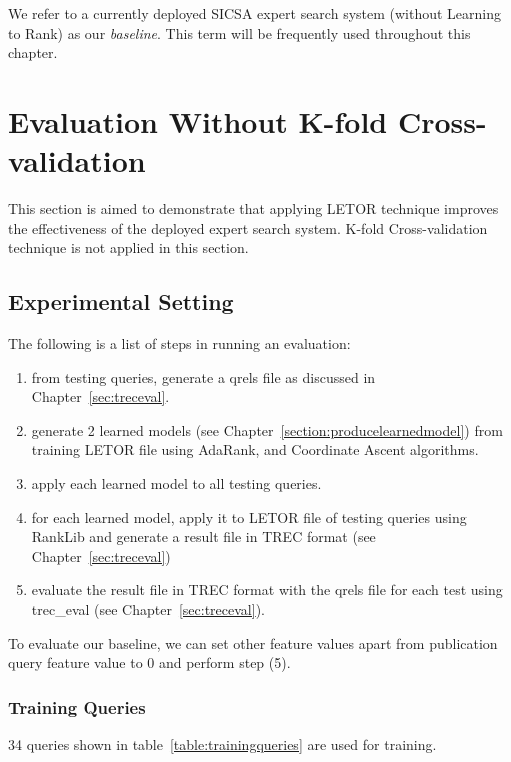 We refer to a currently deployed SICSA expert search system (without Learning to Rank) as our \textit{baseline}. This term will be frequently used 
throughout this chapter.

\section{Evaluation Without K-fold Cross-validation}
This section is aimed to demonstrate that applying LETOR technique improves the effectiveness of the deployed expert search system. 
K-fold Cross-validation technique is not applied in this section.

\subsection{Experimental Setting}
 The following is a list of steps in running an evaluation:
\begin{enumerate}
 \item from testing queries, generate a qrels file as discussed in Chapter~\ref{sec:treceval}.
 \item generate 2 learned models (see Chapter~\ref{section:producelearnedmodel}) from training LETOR file using AdaRank, and Coordinate Ascent algorithms.
 \item apply each learned model to all testing queries.
 \item for each learned model, apply it to LETOR file of testing queries using RankLib and generate a result file in TREC format (see Chapter~\ref{sec:treceval}) 
 \item evaluate the result file in TREC format with the qrels file for each test using trec\_eval (see Chapter~\ref{sec:treceval}).
\end{enumerate}

To evaluate our baseline, we can set other feature values apart from publication query feature value to 0 and perform step (5).

\subsubsection{Training Queries}
34 queries shown in table~\ref{table:trainingqueries} are used for training. 

